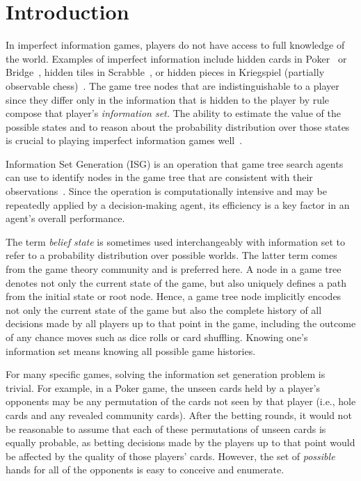 \documentclass[10pt, conference, compsocconf]{IEEEtran}
\begin{document}
\section{Introduction}
In imperfect information games, players do not have access to full knowledge of
the world. Examples of imperfect information include hidden cards in
Poker~\cite{billings02challenge} or Bridge~\cite{ginsberg96partition}, hidden
tiles in Scrabble~\cite{richards07opponent}, or hidden pieces in 
Kriegspiel (partially observable chess)~\cite{li94chess}. The game tree nodes
that are indistinguishable to a player since they differ only in the
information that is hidden to the player by rule compose that player's {\em
information set.}  The ability to estimate the value of the possible states and
to reason about the probability distribution over those states is crucial to
playing imperfect information games well~\cite{schofield12hyperplay}. 

Information Set Generation (ISG) is an operation that game tree search agents
can use to identify nodes in the game tree that are consistent with their
observations~\cite{richards12information}.  Since the operation is
computationally intensive and may be repeatedly applied by a decision-making
agent, its efficiency is a key factor in an agent's overall performance.   

The term {\em belief state} is sometimes used interchangeably with information
set to refer to a probability distribution over possible worlds.  The latter
term comes from the game theory community and is preferred here.  A node in a
game tree denotes not only the current state of the game, but also uniquely
defines a path from the initial state or root node.  Hence, a game tree node
implicitly encodes not only the current state of the game but also the complete
history of all decisions made by all players up to that point in the game,
including the outcome of any chance moves such as dice rolls or card shuffling.
Knowing one's information set means knowing all possible game histories.

For many specific games, solving the information set generation problem is
trivial.  For example, in a Poker game, the unseen cards held by a player's
opponents may be any permutation of the cards not seen by that player (i.e.,
hole cards and any revealed community cards).  After the betting rounds, it
would not be reasonable to assume that each of these permutations of unseen
cards is equally probable, as betting decisions made by the players up to that
point would be affected by the quality of those players' cards.  However, the set of
{\em possible} hands for all of the opponents is easy to conceive and
enumerate.
\end{document}
